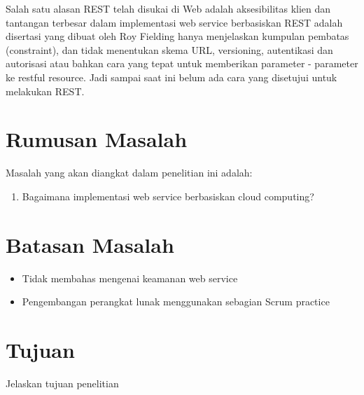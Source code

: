 \documentclass[a4paper, 12pt]{report}
\begin{document}
Salah satu alasan REST telah disukai di Web adalah aksesibilitas klien dan tantangan terbesar dalam implementasi web service berbasiskan REST adalah disertasi yang dibuat oleh Roy Fielding hanya menjelaskan kumpulan pembatas (constraint), dan tidak menentukan skema URL, versioning, autentikasi dan autorisasi atau bahkan cara yang tepat untuk memberikan parameter - parameter ke restful resource. Jadi sampai saat ini belum ada cara yang disetujui untuk melakukan REST.\cite{programmableweb-apis}


\section*{Rumusan Masalah}
\begin{flushleft}
Masalah yang akan diangkat dalam penelitian ini adalah:
\begin{enumerate}
  \item Bagaimana implementasi web service berbasiskan cloud computing?
\end{enumerate}
\end{flushleft}

\section*{Batasan Masalah}
\begin{flushleft}
\begin{itemize}
  \item Tidak membahas mengenai keamanan web service
  \item Pengembangan perangkat lunak menggunakan sebagian Scrum practice
\end{itemize}
\end{flushleft}

\section*{Tujuan}
\begin{flushleft}
Jelaskan tujuan penelitian
\end{flushleft}
\end{document}
